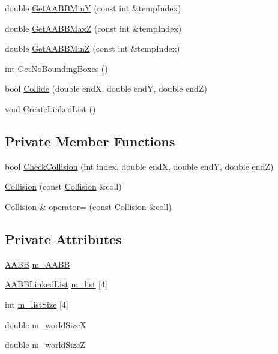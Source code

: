 \begin{DoxyCompactItemize}
double \hyperlink{class_collision_a3e246319658fd5a998798ca6b31d3928}{Get\+A\+A\+B\+B\+MinY} (const int \&temp\+Index)
\item 
double \hyperlink{class_collision_acc43c167003e4a0b9acbd3cd115bb63e}{Get\+A\+A\+B\+B\+MaxZ} (const int \&temp\+Index)
\item 
double \hyperlink{class_collision_a30a4c5b51585ee4ea10d6b7a7a7b2539}{Get\+A\+A\+B\+B\+MinZ} (const int \&temp\+Index)
\item 
int \hyperlink{class_collision_affd6aa970fc603b44dab681f551baef1}{Get\+No\+Bounding\+Boxes} ()
\item 
bool \hyperlink{class_collision_a0b97a69bc20aeecc04e5c4359e675af7}{Collide} (double endX, double endY, double endZ)
\item 
void \hyperlink{class_collision_a30554164f1f1501dc707bcec81e3fd34}{Create\+Linked\+List} ()
\end{DoxyCompactItemize}
\subsection*{Private Member Functions}
\begin{DoxyCompactItemize}
\item 
bool \hyperlink{class_collision_aa2f957eb7ad08fb81e993e6a55c2d5c0}{Check\+Collision} (int index, double endX, double endY, double endZ)
\item 
\hyperlink{class_collision_a4b74f854ccef698607a86b15a7783434}{Collision} (const \hyperlink{class_collision}{Collision} \&coll)
\item 
\hyperlink{class_collision}{Collision} \& \hyperlink{class_collision_a4fe027eb6fa039decbb3712eeedda396}{operator=} (const \hyperlink{class_collision}{Collision} \&coll)
\end{DoxyCompactItemize}
\subsection*{Private Attributes}
\begin{DoxyCompactItemize}
\item 
\hyperlink{class_a_a_b_b}{A\+A\+BB} \hyperlink{class_collision_a88ee51f46c755e9fde0eaeea3ccc841c}{m\+\_\+\+A\+A\+BB}
\item 
\hyperlink{class_a_a_b_b_linked_list}{A\+A\+B\+B\+Linked\+List} \hyperlink{class_collision_ada3810edb7dd64df4afc1d30097385ca}{m\+\_\+list} \mbox{[}4\mbox{]}
\item 
int \hyperlink{class_collision_a672db5b63f40954a5c7ddc2077dcd0dd}{m\+\_\+list\+Size} \mbox{[}4\mbox{]}
\item 
double \hyperlink{class_collision_a623ab40059b558aee3a4d7ec9f36e584}{m\+\_\+world\+SizeX}
\item 
double \hyperlink{class_collision_a1a38403384262f9817e46e125e77601b}{m\+\_\+world\+SizeZ}
\end{DoxyCompactItemize}


